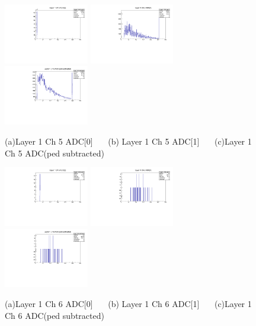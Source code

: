 \documentclass[a4paper,11pt]{article}
\theoremstyle{mytheor}
\begin{document}
\begin{figure}[H] 
\vspace*{-0.3cm} 
\includegraphics[width=0.33\textwidth,scale=0.5,trim=0 0 0 0,clip]{plotsdir/file0_test-Layer1_Ch5_adc0-1.pdf} 
\includegraphics[width=0.33\textwidth,scale=0.5,trim=0 0 0 0,clip]{plotsdir/file0_test-Layer1_Ch5_adc1-1.pdf} 
\includegraphics[width=0.33\textwidth,scale=0.5,trim=0 0 0 0,clip]{plotsdir/file0_test-Layer1_Ch5_adcPedsub-1.pdf} 
\caption{(a)Layer 1 Ch 5 ADC[0] ~~~(b) Layer 1 Ch 5 ADC[1] ~~~(c)Layer 1 Ch 5 ADC(ped subtracted) } 
\end{figure} 
\clearpage 
\begin{figure}[H] 
\vspace*{-0.3cm} 
\includegraphics[width=0.33\textwidth,scale=0.5,trim=0 0 0 0,clip]{plotsdir/file0_test-Layer1_Ch6_adc0-1.pdf} 
\includegraphics[width=0.33\textwidth,scale=0.5,trim=0 0 0 0,clip]{plotsdir/file0_test-Layer1_Ch6_adc1-1.pdf} 
\includegraphics[width=0.33\textwidth,scale=0.5,trim=0 0 0 0,clip]{plotsdir/file0_test-Layer1_Ch6_adcPedsub-1.pdf} 
\caption{(a)Layer 1 Ch 6 ADC[0] ~~~(b) Layer 1 Ch 6 ADC[1] ~~~(c)Layer 1 Ch 6 ADC(ped subtracted) } 
\end{figure} 
\end{document}
